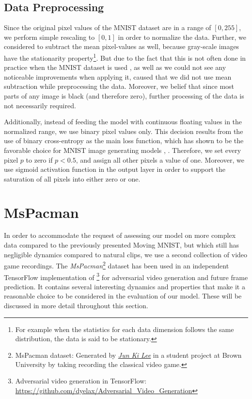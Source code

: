 \subsection{Data Preprocessing}

Since the original pixel values of the MNIST dataset are in a range of $[0, 255]$, we perform simple rescaling to $[0, 1]$ in order to normalize the data. Further, we considered to subtract the mean pixel-values as well, because gray-scale images have the stationarity property\footnote{For example when the statistics for each data dimension follows the same distribution, the data is said to be stationary.}. But due to the fact that this is not often done in practice when the MNIST dataset is used \parencite{stanford_data_pre}, as well as we could not see any noticeable improvements when applying it, caused that we did not use mean subtraction while preprocessing the data. Moreover, we belief that since most parts of any image is black (and therefore zero), further processing of the data is not necessarily required.

Additionally, instead of feeding the model with continuous floating values in the normalized range, we use binary pixel values only. This decision results from the use of binary cross-entropy as the main loss function, which has shown to be the favorable choice for MNIST image generating models \parencite{unsup_learn_lstm}, \parencite{conv_lstm_nowcasting}. Therefore, we set every pixel $p$ to zero if $p < 0.5 $, and assign all other pixels a value of one. Moreover, we use sigmoid activation function in the output layer in order to support the saturation of all pixels into either zero or one.

\section{MsPacman} \label{sec:ds_pac}

In order to accommodate the request of assessing our model on more complex data compared to the previously presented Moving MNIST, but which still has negligible dynamics compared to natural clips, we use a second collection of video game recordings. The \textit{MsPacman}\footnote{MsPacman dataset: Generated by \href{mailto:jun_ki_lee@brown.edu}{\textit{Jun Ki Lee}} in a student project at Brown University by taking recording the classical video game.} dataset has been used in an independent TensorFlow implementation of \parencite{deep_multiscale_video_pred}\footnote{Adversarial video generation in TensorFlow:\\ \url{https://github.com/dyelax/Adversarial_Video_Generation}} for adversarial video generation and future frame prediction. It contains several interesting dynamics and properties that make it a reasonable choice to be considered in the evaluation of our model. These will be discussed in more detail throughout this section.

